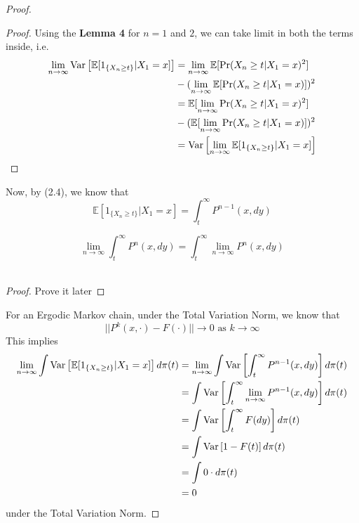 \begin{theorem}
\begin{proof}
\begin{lem}
\begin{proof}
                Using the \textbf{Lemma 4} for $n = 1$ and $2$, we can take limit in both the terms inside, i.e.
                \begin{align*}
                    \lim_{n \rightarrow \infty} \text{Var}\left[{{\mathbb{E}[1_{\{X_{n} \geq t\}}|X_1=x]}}\right] &= \lim_{n \rightarrow \infty} \mathbb{E}[\Pr(X_{n} \geq t | X_{1} = x)^2]\\
                    &- (\lim_{n \rightarrow \infty} \mathbb{E}[\Pr(X_{n} \geq t | X_{1} = x)])^2\\
                    &= \mathbb{E}[\lim_{n \rightarrow \infty} \Pr(X_{n} \geq t | X_{1} = x)^2]\\
                    &- (\mathbb{E}[\lim_{n \rightarrow \infty}\Pr(X_{n} \geq t | X_{1} = x)])^2\\
                    &= \text{Var}\left[{{\lim_{n \rightarrow \infty} \mathbb{E}[1_{\{X_{n} \geq t\}}|X_1=x]}}\right]
                \end{align*}
            \end{proof}
        \end{lem}
        Now, by (2.4), we know that
        \begin{equation*}
            \mathbb{E}[1_{\{X_{n} \geq t\}}|X_1=x] = \int_t^{\infty} P^{n-1}(x, dy)
        \end{equation*}
        \begin{lem}
            $$\lim_{n \rightarrow \infty} \int_t^{\infty} P^{n}(x, dy) = \int_t^{\infty} \lim_{n \rightarrow \infty} P^{n}(x, dy)$$\
            \begin{proof}
                Prove it later
            \end{proof}
        \end{lem}
        For an Ergodic Markov chain, under the Total Variation Norm, we know that
        \begin{equation*}
            ||P^k(x, \cdot) - F(\cdot)|| \rightarrow 0 \text{ as } k \rightarrow \infty
        \end{equation*}
        This implies
        \begin{align*}
            \lim_{n \rightarrow \infty} \int \text{Var}\left[{{\mathbb{E}[1_{\{X_{n} \geq t\}}|X_1=x]}}\right] d\pi(t) &= \lim_{n \rightarrow \infty} \int \text{Var}\left[{{\int_t^{\infty} P^{n-1}(x, dy)}}\right] d\pi(t)\\
            &= \int \text{Var}\left[{{\int_t^{\infty} \lim_{n \rightarrow \infty} P^{n-1}(x, dy)}}\right] d\pi(t)\\
            &= \int \text{Var}\left[{{\int_t^{\infty} F(dy)}}\right] d\pi(t)\\
            &= \int \text{Var}\left[{{1-F(t)}}\right] d\pi(t)\\
            &= \int 0 \cdot d\pi(t)\\
            &= 0
        \end{align*}
        under the Total Variation Norm.
    \end{proof}
\end{theorem}

